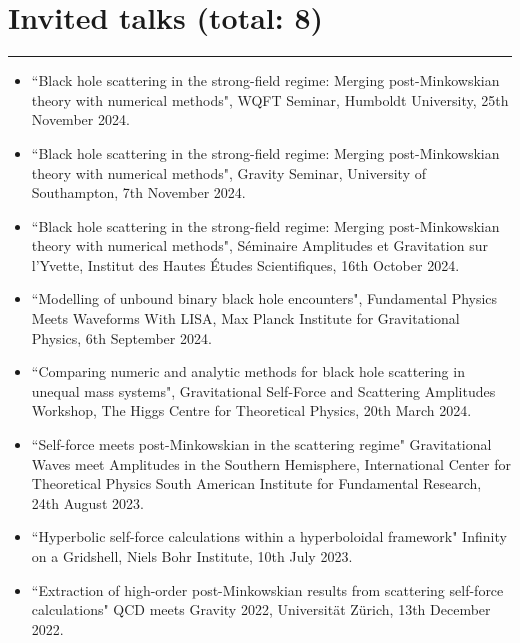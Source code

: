 \documentclass[10.5pt, oneside]{article}   	%
\begin{document}
 
  {\color{Sectioncolour}
\section*{Invited talks {\rm (total: 8)}}
\vspace{-3mm}
\noindent\rule{\linewidth}{0.6pt}}
\begin{itemize}
\item ``Black hole scattering in the strong-field regime: Merging post-Minkowskian theory with numerical methods", WQFT Seminar, Humboldt University, 25th November 2024.
\item ``Black hole scattering in the strong-field regime: Merging post-Minkowskian theory with numerical methods", Gravity Seminar, University of Southampton, 7th November 2024.
\item ``Black hole scattering in the strong-field regime: Merging post-Minkowskian theory with numerical methods", Séminaire Amplitudes et Gravitation sur l'Yvette, Institut des Hautes Études Scientifiques, 16th October 2024.
\item ``Modelling of unbound binary black hole encounters", Fundamental Physics Meets Waveforms With LISA, Max Planck Institute for Gravitational Physics, 6th September 2024.
\item ``Comparing numeric and analytic methods for black hole scattering in unequal mass systems", Gravitational Self-Force and Scattering Amplitudes Workshop, The Higgs Centre for Theoretical Physics, 20th March 2024.
\item ``Self-force meets post-Minkowskian in the scattering regime" Gravitational Waves meet Amplitudes in the Southern Hemisphere, International Center for Theoretical Physics South American Institute for Fundamental Research, 24th August 2023.
\item``Hyperbolic self-force calculations within a hyperboloidal framework" Infinity on a Gridshell, Niels Bohr Institute, 10th July 2023.
\item ``Extraction of high-order post-Minkowskian results from scattering self-force calculations" QCD meets Gravity 2022, Universität Zürich, 13th December 2022.
\end{itemize} 
 
\end{document}
